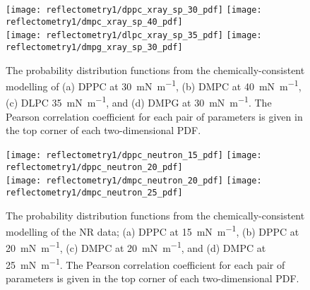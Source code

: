 %
%
\begin{figure}
    \centering
    \texttt{[image: reflectometry1/dppc\_xray\_sp\_30\_pdf]}
    \texttt{[image: reflectometry1/dmpc\_xray\_sp\_40\_pdf]} \\
    \texttt{[image: reflectometry1/dlpc\_xray\_sp\_35\_pdf]}
    \texttt{[image: reflectometry1/dmpg\_xray\_sp\_30\_pdf]}
    \caption{The probability distribution functions from the chemically-consistent modelling of (a) DPPC at \SI{30}{\milli\newton\per\meter}, (b) DMPC at \SI{40}{\milli\newton\per\meter}, (c) DLPC \SI{35}{\milli\newton\per\meter}, and (d) DMPG at \SI{30}{\milli\newton\per\meter}. The Pearson correlation coefficient for each pair of parameters is given in the top corner of each two-dimensional PDF.}
    \label{fig:pdfs4}
\end{figure}
%
%
\begin{figure}
    \centering
    \texttt{[image: reflectometry1/dppc\_neutron\_15\_pdf]}
    \texttt{[image: reflectometry1/dppc\_neutron\_20\_pdf]} \\
    \texttt{[image: reflectometry1/dmpc\_neutron\_20\_pdf]}
    \texttt{[image: reflectometry1/dmpc\_neutron\_25\_pdf]}
    \caption{The probability distribution functions from the chemically-consistent modelling of the NR data; (a) DPPC at \SI{15}{\milli\newton\per\meter}, (b) DPPC at \SI{20}{\milli\newton\per\meter}, (c) DMPC at \SI{20}{\milli\newton\per\meter}, and (d) DMPC at \SI{25}{\milli\newton\per\meter}. The Pearson correlation coefficient for each pair of parameters is given in the top corner of each two-dimensional PDF.}
    \label{fig:nrpdfs}
\end{figure}

